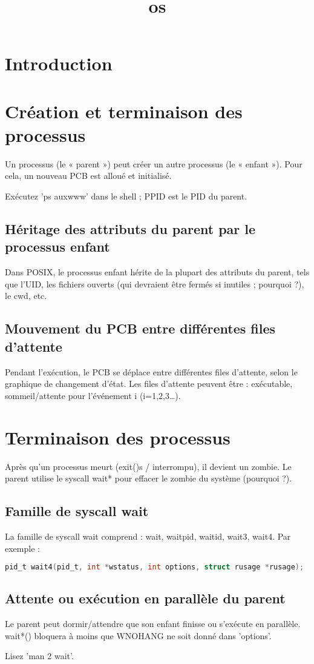 \documentclass[12pt]{report}
\title{os}
\author{}
\begin{document}
\maketitle
\tableofcontents
\newpage

\section{Introduction}
  \section{Création et terminaison des processus}  Un processus (le « parent ») peut créer un autre processus (le « enfant »). Pour cela, un nouveau PCB est alloué et initialisé.\  \begin{tcolorbox}[colback=yellow!5, colframe=yellow!80!black, title={\faBookmark À retenir}]  Exécutez 'ps auxwww' dans le shell ; PPID est le PID du parent.  \end{tcolorbox}    \subsection{Héritage des attributs du parent par le processus enfant}  Dans POSIX, le processus enfant hérite de la plupart des attributs du parent, tels que l'UID, les fichiers ouverts (qui devraient être fermés si inutiles ; pourquoi ?), le cwd, etc.    \subsection{Mouvement du PCB entre différentes files d'attente}  Pendant l'exécution, le PCB se déplace entre différentes files d'attente, selon le graphique de changement d'état. Les files d'attente peuvent être : exécutable, sommeil/attente pour l'événement i (i=1,2,3…).    \section{Terminaison des processus}  Après qu'un processus meurt (exit()s / interrompu), il devient un zombie. Le parent utilise le syscall wait* pour effacer le zombie du système (pourquoi ?).    \subsection{Famille de syscall wait}  La famille de syscall wait comprend : wait, waitpid, waitid, wait3, wait4. Par exemple :  \begin{lstlisting}[language=C]  pid_t wait4(pid_t, int *wstatus, int options, struct rusage *rusage);  \end{lstlisting}    \subsection{Attente ou exécution en parallèle du parent}  Le parent peut dormir/attendre que son enfant finisse ou s'exécute en parallèle. wait*() bloquera à moins que WNOHANG ne soit donné dans 'options'.  \begin{tcolorbox}[colback=yellow!5, colframe=yellow!80!black, title={\faBookmark À retenir}]  Lisez 'man 2 wait'.  \end{tcolorbox}  
\end{document}
